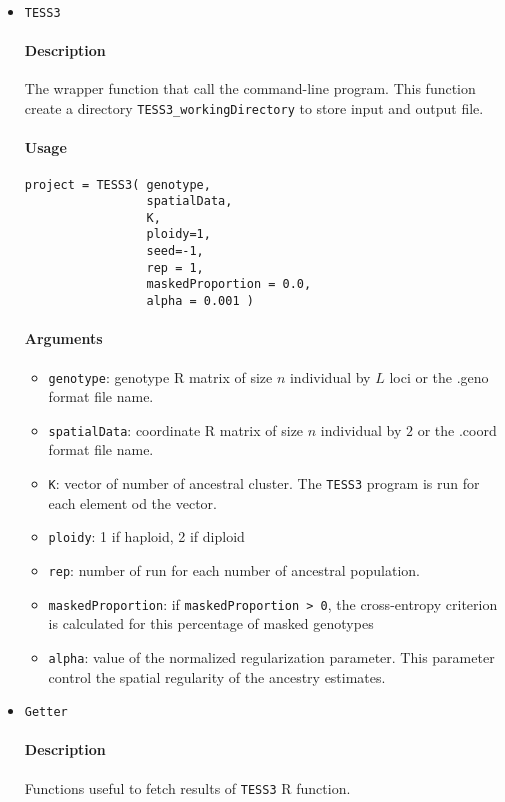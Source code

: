 \documentclass[10pt,a4paper]{article}
\begin{document}
\begin{itemize}

\item \verb|TESS3|

\paragraph{Description}
The wrapper function that call the command-line program. This function create a directory \verb|TESS3_workingDirectory| to store input and output file.
\paragraph{Usage}
\begin{Verbatim}
project = TESS3( genotype,
                 spatialData,
                 K,
                 ploidy=1,
                 seed=-1, 
                 rep = 1, 
                 maskedProportion = 0.0, 
                 alpha = 0.001 )
\end{Verbatim}
\paragraph{Arguments}
\begin{itemize}
\item \verb|genotype|: genotype R matrix of size $n$ individual by $L$ loci or the .geno format file name.
\item \verb|spatialData|: coordinate R matrix of size $n$ individual by $2$ or the .coord format file name.
\item \verb|K|: vector of number of ancestral cluster. The {\tt TESS3} program is run for each element od the vector.
\item \verb|ploidy|: 1 if haploid, 2 if diploid
\item \verb|rep|: number of run for each number of ancestral population.
\item \verb|maskedProportion|: if \verb|maskedProportion > 0|, the cross-entropy criterion is calculated for this percentage of masked genotypes
\item \verb|alpha|: value of the normalized regularization parameter. This parameter control the spatial regularity of the ancestry estimates.
\end{itemize}

\item \verb|Getter|

\paragraph{Description}
Functions useful to fetch results of \verb|TESS3| R function.

\end{itemize}
\end{document}
